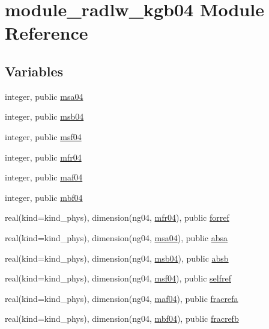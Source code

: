 \hypertarget{namespacemodule__radlw__kgb04}{}\section{module\+\_\+radlw\+\_\+kgb04 Module Reference}
\label{namespacemodule__radlw__kgb04}
\subsection*{Variables}
\begin{DoxyCompactItemize}
\item 
integer, public \hyperlink{namespacemodule__radlw__kgb04_ac8c5caff005fd04d01009dd9e977d570}{msa04}
\item 
integer, public \hyperlink{group__module__radlw__main_gab9ce0111a156f7b80f2adaa9f3e84a32}{msb04}
\item 
integer, public \hyperlink{group__module__radlw__main_ga4b38dd1165aca80e19697df7ae74a27a}{msf04}
\item 
integer, public \hyperlink{group__module__radlw__main_gab6ae25b4a793bf78ccd504685d639039}{mfr04}
\item 
integer, public \hyperlink{group__module__radlw__main_ga60ff35def4e526c7d9cf3ec88bdd4485}{maf04}
\item 
integer, public \hyperlink{group__module__radlw__main_ga768f4447809fb11206dce383a121d595}{mbf04}
\item 
real(kind=kind\+\_\+phys), dimension(ng04, \hyperlink{group__module__radlw__main_gab6ae25b4a793bf78ccd504685d639039}{mfr04}), public \hyperlink{group__module__radlw__main_ga816fd065291a92c13d026d38a708479b}{forref}
\item 
real(kind=kind\+\_\+phys), dimension(ng04, \hyperlink{namespacemodule__radlw__kgb04_ac8c5caff005fd04d01009dd9e977d570}{msa04}), public \hyperlink{group__module__radlw__main_ga8d73bb6971c872e15a24a81d3917167e}{absa}
\item 
real(kind=kind\+\_\+phys), dimension(ng04, \hyperlink{group__module__radlw__main_gab9ce0111a156f7b80f2adaa9f3e84a32}{msb04}), public \hyperlink{group__module__radlw__main_gaaacc55911b42c67396b5cdc4318e0d5f}{absb}
\item 
real(kind=kind\+\_\+phys), dimension(ng04, \hyperlink{group__module__radlw__main_ga4b38dd1165aca80e19697df7ae74a27a}{msf04}), public \hyperlink{group__module__radlw__main_ga696b91ef86ccbda17df10f770797cafa}{selfref}
\item 
real(kind=kind\+\_\+phys), dimension(ng04, \hyperlink{group__module__radlw__main_ga60ff35def4e526c7d9cf3ec88bdd4485}{maf04}), public \hyperlink{group__module__radlw__main_gace1d87742e2c543d9b0662e1c7d2b624}{fracrefa}
\item 
real(kind=kind\+\_\+phys), dimension(ng04, \hyperlink{group__module__radlw__main_ga768f4447809fb11206dce383a121d595}{mbf04}), public \hyperlink{group__module__radlw__main_gae8d5d56d09dfbe06d918c6b098e3fddf}{fracrefb}
\end{DoxyCompactItemize}


